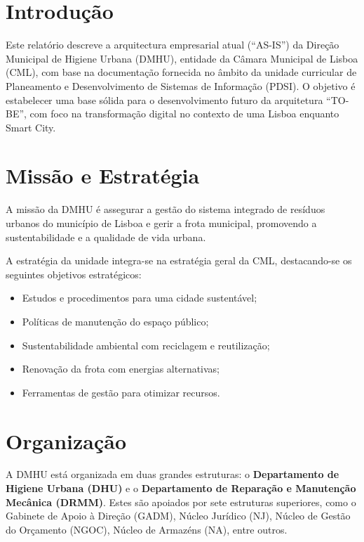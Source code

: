 \documentclass[12pt,a4paper,final]{article}
\begin{document}
    \section{Introdução}
    Este relatório descreve a arquitectura empresarial atual (“AS-IS”) da Direção Municipal de Higiene Urbana (DMHU), entidade da Câmara Municipal de Lisboa (CML), com base na documentação fornecida no âmbito da unidade curricular de Planeamento e Desenvolvimento de Sistemas de Informação (PDSI). O objetivo é estabelecer uma base sólida para o desenvolvimento futuro da arquitetura “TO-BE”, com foco na transformação digital no contexto de uma Lisboa enquanto Smart City.

    \section{Missão e Estratégia}
    A missão da DMHU é assegurar a gestão do sistema integrado de resíduos urbanos do município de Lisboa e gerir a frota municipal, promovendo a sustentabilidade e a qualidade de vida urbana.

    A estratégia da unidade integra-se na estratégia geral da CML, destacando-se os seguintes objetivos estratégicos:
    \begin{itemize}
        \item Estudos e procedimentos para uma cidade sustentável;
        \item Políticas de manutenção do espaço público;
        \item Sustentabilidade ambiental com reciclagem e reutilização;
        \item Renovação da frota com energias alternativas;
        \item Ferramentas de gestão para otimizar recursos.
    \end{itemize}

    \section{Organização}
    A DMHU está organizada em duas grandes estruturas: o \textbf{Departamento de Higiene Urbana (DHU)} e o \textbf{Departamento de Reparação e Manutenção Mecânica (DRMM)}. Estes são apoiados por sete estruturas superiores, como o Gabinete de Apoio à Direção (GADM), Núcleo Jurídico (NJ), Núcleo de Gestão do Orçamento (NGOC), Núcleo de Armazéns (NA), entre outros.
\end{document}
